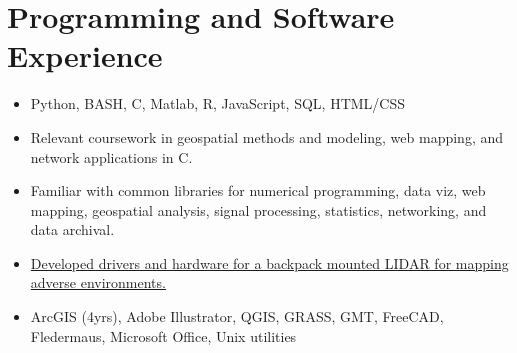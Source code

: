 \section{Programming and Software Experience}
\begin{itemize}
\item Python, BASH, C, Matlab, R, JavaScript, SQL, HTML/CSS
\item Relevant coursework in geospatial methods and modeling, web mapping, and network applications in C.
\item Familiar with common libraries for numerical programming, data viz,
  web mapping, geospatial analysis, signal processing, statistics, networking, and data archival. 
\item \href{https://github.com/tohodson/velodyne_tools}{Developed drivers and hardware for a backpack mounted LIDAR for mapping adverse environments.}
\item ArcGIS (4yrs), Adobe Illustrator, QGIS, GRASS, GMT, FreeCAD, Fledermaus, Microsoft Office, Unix utilities
\end{itemize}
